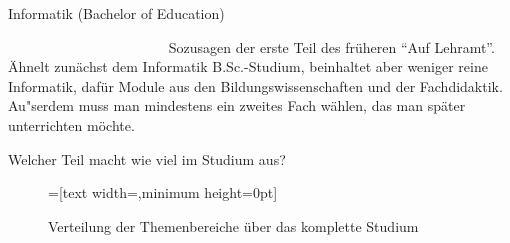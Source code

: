 
\begin{Huge}
	  Informatik (Bachelor of Education)
\end{Huge}

\begin{exampleblock}{\textcolor{white}{Was ist der Studiengang?}}
  Sozusagen der erste Teil des fr\"uheren "`Auf Lehramt"'. \"Ahnelt zun\"achst dem Informatik B.Sc.-Studium, beinhaltet aber weniger reine Informatik, daf\"ur Module aus den Bildungswissenschaften und der Fachdidaktik. Au"serdem muss man mindestens ein zweites Fach w\"ahlen, das man sp\"ater unterrichten m\"ochte.
\end{exampleblock}

\begin{block}{Welcher Teil macht wie viel im Studium aus?}
	\begin{figure}[h!]
		\vspace{-10pt}
		\begin{minipage}{\linewidth}
				\centering
				=[text width={},minimum height=0pt]
		\end{minipage}
		\vspace{-20pt}
		\caption{Verteilung der Themenbereiche \"uber das komplette Studium}
	\end{figure}
\end{block}


